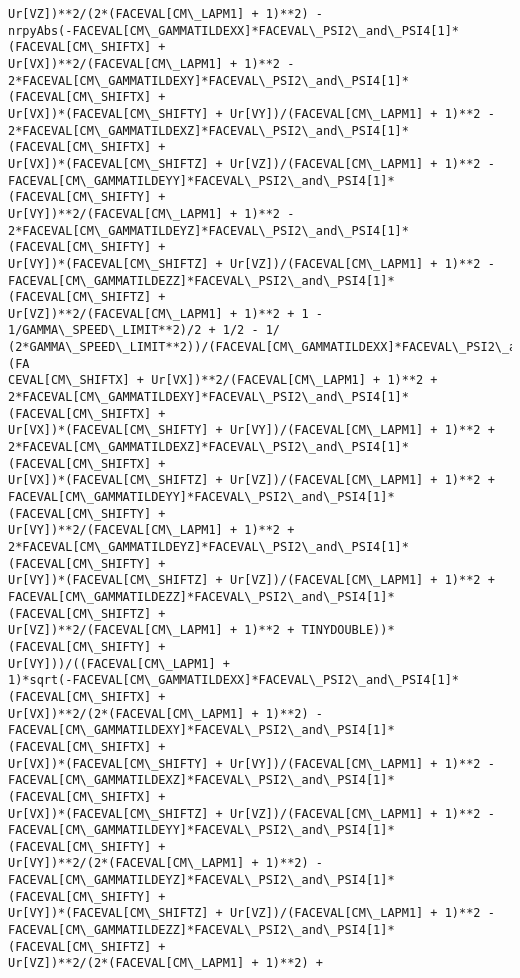 \documentclass[landscape,letterpaper,10pt,english]{article}
\begin{document}
\begin{Verbatim}[commandchars=\\\{\}]
Ur[VZ])**2/(2*(FACEVAL[CM\_LAPM1] + 1)**2) -
nrpyAbs(-FACEVAL[CM\_GAMMATILDEXX]*FACEVAL\_PSI2\_and\_PSI4[1]*(FACEVAL[CM\_SHIFTX] +
Ur[VX])**2/(FACEVAL[CM\_LAPM1] + 1)**2 -
2*FACEVAL[CM\_GAMMATILDEXY]*FACEVAL\_PSI2\_and\_PSI4[1]*(FACEVAL[CM\_SHIFTX] +
Ur[VX])*(FACEVAL[CM\_SHIFTY] + Ur[VY])/(FACEVAL[CM\_LAPM1] + 1)**2 -
2*FACEVAL[CM\_GAMMATILDEXZ]*FACEVAL\_PSI2\_and\_PSI4[1]*(FACEVAL[CM\_SHIFTX] +
Ur[VX])*(FACEVAL[CM\_SHIFTZ] + Ur[VZ])/(FACEVAL[CM\_LAPM1] + 1)**2 -
FACEVAL[CM\_GAMMATILDEYY]*FACEVAL\_PSI2\_and\_PSI4[1]*(FACEVAL[CM\_SHIFTY] +
Ur[VY])**2/(FACEVAL[CM\_LAPM1] + 1)**2 -
2*FACEVAL[CM\_GAMMATILDEYZ]*FACEVAL\_PSI2\_and\_PSI4[1]*(FACEVAL[CM\_SHIFTY] +
Ur[VY])*(FACEVAL[CM\_SHIFTZ] + Ur[VZ])/(FACEVAL[CM\_LAPM1] + 1)**2 -
FACEVAL[CM\_GAMMATILDEZZ]*FACEVAL\_PSI2\_and\_PSI4[1]*(FACEVAL[CM\_SHIFTZ] +
Ur[VZ])**2/(FACEVAL[CM\_LAPM1] + 1)**2 + 1 - 1/GAMMA\_SPEED\_LIMIT**2)/2 + 1/2 - 1/
(2*GAMMA\_SPEED\_LIMIT**2))/(FACEVAL[CM\_GAMMATILDEXX]*FACEVAL\_PSI2\_and\_PSI4[1]*(FA
CEVAL[CM\_SHIFTX] + Ur[VX])**2/(FACEVAL[CM\_LAPM1] + 1)**2 +
2*FACEVAL[CM\_GAMMATILDEXY]*FACEVAL\_PSI2\_and\_PSI4[1]*(FACEVAL[CM\_SHIFTX] +
Ur[VX])*(FACEVAL[CM\_SHIFTY] + Ur[VY])/(FACEVAL[CM\_LAPM1] + 1)**2 +
2*FACEVAL[CM\_GAMMATILDEXZ]*FACEVAL\_PSI2\_and\_PSI4[1]*(FACEVAL[CM\_SHIFTX] +
Ur[VX])*(FACEVAL[CM\_SHIFTZ] + Ur[VZ])/(FACEVAL[CM\_LAPM1] + 1)**2 +
FACEVAL[CM\_GAMMATILDEYY]*FACEVAL\_PSI2\_and\_PSI4[1]*(FACEVAL[CM\_SHIFTY] +
Ur[VY])**2/(FACEVAL[CM\_LAPM1] + 1)**2 +
2*FACEVAL[CM\_GAMMATILDEYZ]*FACEVAL\_PSI2\_and\_PSI4[1]*(FACEVAL[CM\_SHIFTY] +
Ur[VY])*(FACEVAL[CM\_SHIFTZ] + Ur[VZ])/(FACEVAL[CM\_LAPM1] + 1)**2 +
FACEVAL[CM\_GAMMATILDEZZ]*FACEVAL\_PSI2\_and\_PSI4[1]*(FACEVAL[CM\_SHIFTZ] +
Ur[VZ])**2/(FACEVAL[CM\_LAPM1] + 1)**2 + TINYDOUBLE))*(FACEVAL[CM\_SHIFTY] +
Ur[VY]))/((FACEVAL[CM\_LAPM1] +
1)*sqrt(-FACEVAL[CM\_GAMMATILDEXX]*FACEVAL\_PSI2\_and\_PSI4[1]*(FACEVAL[CM\_SHIFTX] +
Ur[VX])**2/(2*(FACEVAL[CM\_LAPM1] + 1)**2) -
FACEVAL[CM\_GAMMATILDEXY]*FACEVAL\_PSI2\_and\_PSI4[1]*(FACEVAL[CM\_SHIFTX] +
Ur[VX])*(FACEVAL[CM\_SHIFTY] + Ur[VY])/(FACEVAL[CM\_LAPM1] + 1)**2 -
FACEVAL[CM\_GAMMATILDEXZ]*FACEVAL\_PSI2\_and\_PSI4[1]*(FACEVAL[CM\_SHIFTX] +
Ur[VX])*(FACEVAL[CM\_SHIFTZ] + Ur[VZ])/(FACEVAL[CM\_LAPM1] + 1)**2 -
FACEVAL[CM\_GAMMATILDEYY]*FACEVAL\_PSI2\_and\_PSI4[1]*(FACEVAL[CM\_SHIFTY] +
Ur[VY])**2/(2*(FACEVAL[CM\_LAPM1] + 1)**2) -
FACEVAL[CM\_GAMMATILDEYZ]*FACEVAL\_PSI2\_and\_PSI4[1]*(FACEVAL[CM\_SHIFTY] +
Ur[VY])*(FACEVAL[CM\_SHIFTZ] + Ur[VZ])/(FACEVAL[CM\_LAPM1] + 1)**2 -
FACEVAL[CM\_GAMMATILDEZZ]*FACEVAL\_PSI2\_and\_PSI4[1]*(FACEVAL[CM\_SHIFTZ] +
Ur[VZ])**2/(2*(FACEVAL[CM\_LAPM1] + 1)**2) +

\end{Verbatim}
\end{document}
